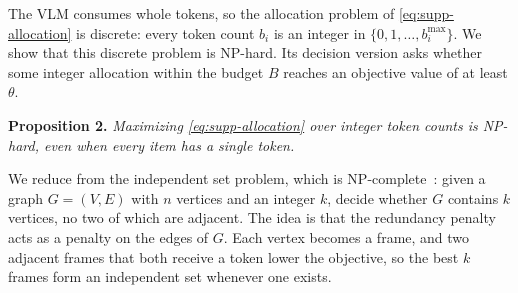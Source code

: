 The VLM consumes whole tokens, so the allocation problem of \cref{eq:supp-allocation} is discrete: every token count $b_i$ is an integer in $\{0,1,\dots,b_i^{\max}\}$. We show that this discrete problem is NP-hard. Its decision version asks whether some integer allocation within the budget $B$ reaches an objective value of at least $\theta$.

\smallskip
\noindent\textbf{Proposition 2.} \textit{Maximizing \cref{eq:supp-allocation} over integer token counts is NP-hard, even when every item has a single token.}

\smallskip
We reduce from the independent set problem, which is NP-complete~\cite{karp1972,garey1979}: given a graph $G=(V,E)$ with $n$ vertices and an integer $k$, decide whether $G$ contains $k$ vertices, no two of which are adjacent. The idea is that the redundancy penalty acts as a penalty on the edges of $G$. Each vertex becomes a frame, and two adjacent frames that both receive a token lower the objective, so the best $k$ frames form an independent set whenever one exists.

